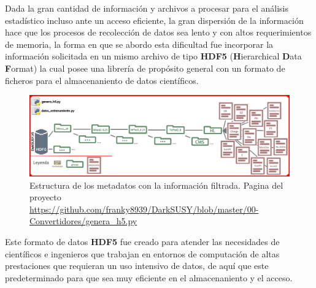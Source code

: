Dada la gran cantidad de información y archivos a procesar para el análisis estadístico incluso ante un acceso eficiente, la gran dispersión de la información hace que los procesos de recolección de datos sea lento y con altos requerimientos de memoria, la forma en que se abordo esta dificultad fue incorporar la información solicitada en un mismo archivo de tipo \textbf{HDF5} (\textbf{H}ierarchical \textbf{D}ata \textbf{F}ormat) la cual posee una librería de propósito general con un formato de ficheros para el almacenaniento de datos científicos. 
\begin{figure}[h]
\centering
\includegraphics[width=1\textwidth]{Simulacion/imagenes/class_darksusy3.png}
\caption{Estructura de los metadatos con la información filtrada. Pagina del proyecto \url{https://github.com/franky8939/DarkSUSY/blob/master/00-Convertidores/genera_h5.py}}
\label{class_darksusy2}
\end{figure}

Este formato de datos \textbf{HDF5} fue creado para atender las necesidades de científicos e ingenieros que trabajan en entornos de computación de altas prestaciones que requieran un uso intensivo de datos, de aquí que este predeterminado para que sea muy eficiente en el almacenaniento y el acceso. 